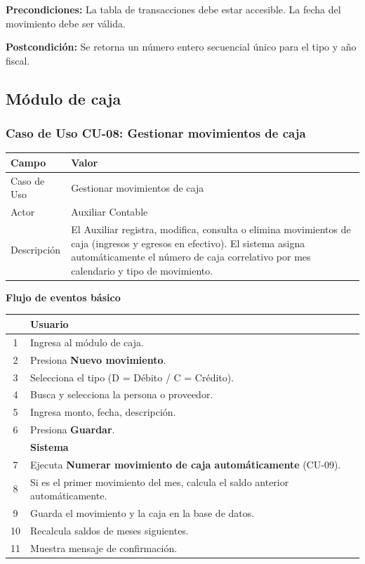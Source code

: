 \documentclass[stu]{apa7}
\begin{document}
\vspace{0.3cm}

\textbf{Precondiciones:} La tabla de transacciones debe estar accesible. La fecha del movimiento debe ser válida.

\textbf{Postcondición:} Se retorna un número entero secuencial único para el tipo y año fiscal.

\newpage

\subsection{Módulo de caja}

\subsubsection{Caso de Uso CU-08: Gestionar movimientos de caja}

\begin{tabularx}{\textwidth}{|l|X|}
\hline
\rowcolor[gray]{0.9}
\textbf{Campo} & \textbf{Valor} \\
\hline
Caso de Uso & Gestionar movimientos de caja \\
\hline
Actor & Auxiliar Contable \\
\hline
Descripción & El Auxiliar registra, modifica, consulta o elimina movimientos de caja (ingresos y egresos en efectivo). El sistema asigna automáticamente el número de caja correlativo por mes calendario y tipo de movimiento. \\
\hline
\end{tabularx}

\vspace{0.3cm}

\textbf{Flujo de eventos básico}

\begin{tabularx}{\textwidth}{|c|X|}
\hline
& \textbf{Usuario} \\
\hline
1 & Ingresa al módulo de caja. \\
\hline
2 & Presiona \textbf{Nuevo movimiento}. \\
\hline
3 & Selecciona el tipo (D = Débito / C = Crédito). \\
\hline
4 & Busca y selecciona la persona o proveedor. \\
\hline
5 & Ingresa monto, fecha, descripción. \\
\hline
6 & Presiona \textbf{Guardar}. \\
\hline
& \textbf{Sistema} \\
\hline
7 & Ejecuta \textbf{Numerar movimiento de caja automáticamente} (CU-09). \\
\hline
8 & Si es el primer movimiento del mes, calcula el saldo anterior automáticamente. \\
\hline
9 & Guarda el movimiento y la caja en la base de datos. \\
\hline
10 & Recalcula saldos de meses siguientes. \\
\hline
11 & Muestra mensaje de confirmación. \\
\hline
\end{tabularx}
\end{document}

